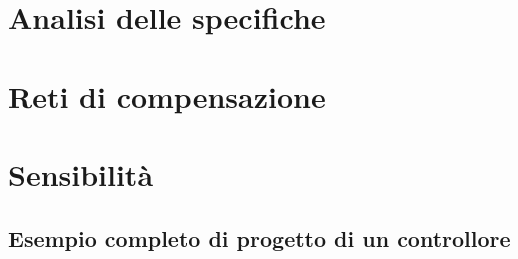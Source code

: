 \documentclass[../main.tex]{subfiles}
\begin{document}
\clearpage
\thispagestyle{empty}

\vspace*{7cm}
\section{Analisi delle specifiche}
\vspace*{1.5cm}








\vspace*{7cm}
\section{Reti di compensazione}
\vspace*{1.5cm}








\vspace*{7cm}
\section{Sensibilità}
\vspace*{1.5cm}



\subsection{Esempio completo di progetto di un controllore}
\end{document}
